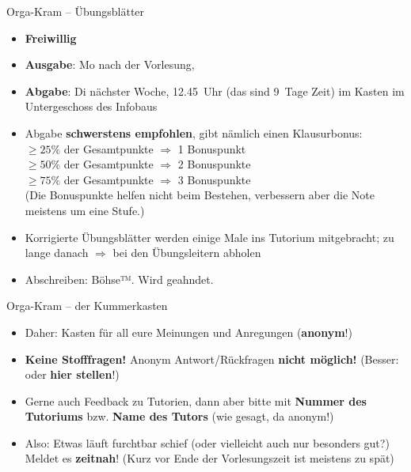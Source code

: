 \begin{frame}{Orga-Kram – Übungsblätter}
	\begin{itemize}
		\item \textbf{Freiwillig}
		\pause
		\item \textbf{Ausgabe}: Mo nach der Vorlesung, 
		\item \textbf{Abgabe}: Di nächster Woche, 12.45~Uhr (das sind 9~Tage Zeit) im Kasten im Untergeschoss des Infobaus
		\pause
		\item Abgabe \textbf{schwerstens empfohlen}, gibt nämlich einen Klausurbonus: \\
		$\geq 25 \%$ der Gesamtpunkte $ \Rightarrow $ 1 Bonuspunkt \\
		$\geq 50 \%$  der Gesamtpunkte $ \Rightarrow $ 2 Bonuspunkte \\
		$\geq 75 \%$  der Gesamtpunkte $ \Rightarrow $ 3 Bonuspunkte \\
		(Die Bonuspunkte helfen nicht beim Bestehen, verbessern aber die Note meistens um eine Stufe.)
		\pause
		\item Korrigierte Übungsblätter werden einige Male ins Tutorium mitgebracht; zu lange danach $\Rightarrow$ bei den Übungsleitern abholen
		\pause
		\item Abschreiben: Böhse™. Wird geahndet.
	\end{itemize}
\end{frame}


\begin{frame}{Orga-Kram – der Kummerkasten} %
	\begin{itemize}
		\item<+-> Daher: Kasten  für all eure Meinungen und Anregungen (\textbf{anonym}!)
		\item<+-> \textbf{Keine Stofffragen!} Anonym \impl Antwort/Rückfragen \textbf{nicht möglich!} (Besser: \ILIAS oder \textbf{hier stellen}!)
		\item<+-> Gerne auch Feedback zu Tutorien, dann aber bitte mit \textbf{Nummer des Tutoriums} bzw. \textbf{Name des Tutors} (wie gesagt, da anonym!)
		\item<+-> Also: Etwas läuft furchtbar schief (oder vielleicht auch nur besonders gut?) \impl Meldet es \textbf{zeitnah}! (Kurz vor Ende der Vorlesungszeit ist meistens zu spät)
	\end{itemize}
\end{frame}


